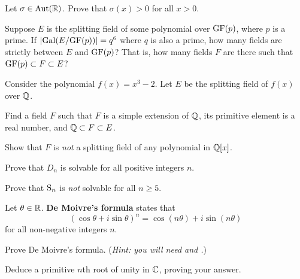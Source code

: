 \begin{problem}
    Let $\sigma \in \mathrm{Aut}(\mathbb{R})$. Prove that $\sigma(x) > 0$ for all $x > 0$.
\end{problem}

\begin{problem}
    Suppose $E$ is the splitting field of some polynomial over $\mathrm{GF}(p)$, where $p$ is a prime. If $|\mathrm{Gal}(E/\mathrm{GF}(p))| = q^6$ where $q$ is also a prime, how many fields are strictly between $E$ and $\mathrm{GF}(p)$? That is, how many fields $F$ are there such that $\mathrm{GF}(p) \subset F \subset E$?
\end{problem}

\begin{problem}
    Consider the polynomial $f(x) = x^3 - 2$. Let $E$ be the splitting field of $f(x)$ over $\mathbb{Q}$.
    \begin{partquestions}{\roman*}
        \item Find a field $F$ such that $F$ is a simple extension of $\mathbb{Q}$, its primitive element is a real number, and $\mathbb{Q} \subset F \subset E$.
        \item Show that $F$ is \textit{not} a splitting field of any polynomial in $\mathbb{Q}[x]$.
    \end{partquestions}
\end{problem}

\begin{problem}
    Prove that $D_n$ is solvable for all positive integers $n$.
\end{problem}

\begin{problem}
    Prove that $\mathrm{S}_{n}$ is \textit{not} solvable for all $n \geq 5$.
\end{problem}

\begin{problem}
    Let $\theta \in \mathbb{R}$. \textbf{De Moivre's formula} states that
    \[
        (\cos\theta + i\sin\theta)^n = \cos(n\theta) + i\sin(n\theta)
    \]
    for all non-negative integers $n$.
    \begin{partquestions}{\roman*}
        \item Prove De Moivre's formula.\newline
        (\textit{Hint: you will need  and .})
        \item Deduce a primitive $n$th root of unity in $\mathbb{C}$, proving your answer.
    \end{partquestions}
\end{problem}

